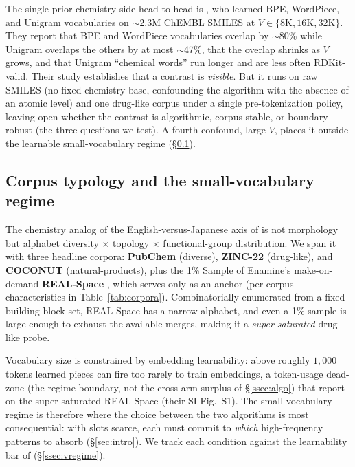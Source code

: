\documentclass{article}
\begin{document}
The single prior chemistry-side head-to-head is
\citet{temizer2024chemical-tokenization}, who learned BPE, WordPiece, and
Unigram vocabularies on $\sim$2.3M ChEMBL \citep{zdrazil2023chembl}
SMILES at $V \in \{8\text{K}, 16\text{K}, 32\text{K}\}$. They report that
BPE and WordPiece vocabularies overlap by $\sim$80\% while Unigram
overlaps the others by at most $\sim$47\%, that the overlap shrinks as
$V$ grows, and that Unigram ``chemical words'' run longer and are less
often RDKit-valid. Their study establishes that a contrast is
\emph{visible}. But it runs on raw SMILES (no fixed chemistry base, confounding
the algorithm with the absence of an atomic level) and one drug-like corpus
under a single pre-tokenization policy, leaving open whether the contrast is
algorithmic, corpus-stable, or boundary-robust (the three questions we test). A fourth
confound, large $V$, places it outside the learnable small-vocabulary regime
(\S\ref{ssec:typology}).

\subsection{Corpus typology and the small-vocabulary
regime}\label{ssec:typology}

The chemistry analog of the English-versus-Japanese axis of
\citet{bostrom2020bpe-suboptimal} is not morphology but alphabet diversity
$\times$ topology $\times$ functional-group distribution. We span it with
three headline corpora: \textbf{PubChem} \citep{pubchem2023} (diverse),
\textbf{ZINC-22} \citep{zinc22} (drug-like), and \textbf{COCONUT}
\citep{sorokina2021coconut} (natural-products), plus the 1\% Sample of
Enamine's make-on-demand \textbf{REAL-Space} \citep{grygorenko2020real,
wadell2026smirk}, which serves only as an anchor (per-corpus
characteristics in Table~\ref{tab:corpora}). Combinatorially enumerated from a
fixed building-block set, REAL-Space has a narrow alphabet, and even a 1\%
sample is large enough to exhaust the available merges, making it a
\emph{super-saturated} drug-like probe.

Vocabulary size is constrained by embedding learnability: above roughly
$1{,}000$ tokens learned pieces can fire too rarely to train embeddings, a
token-usage dead-zone (the regime boundary, not the cross-arm surplus of
\S\ref{ssec:algo}) that \citet{wadell2026smirk}
report on the super-saturated REAL-Space (their SI Fig.~S1). The small-vocabulary regime is therefore
where the choice between the two algorithms is most consequential: with slots
scarce, each must commit to \emph{which} high-frequency patterns to absorb
(\S\ref{sec:intro}). We track each condition against the learnability bar of
\citet{gowda2020optimal-vocab-nmt} (\S\ref{ssec:vregime}).
\end{document}

